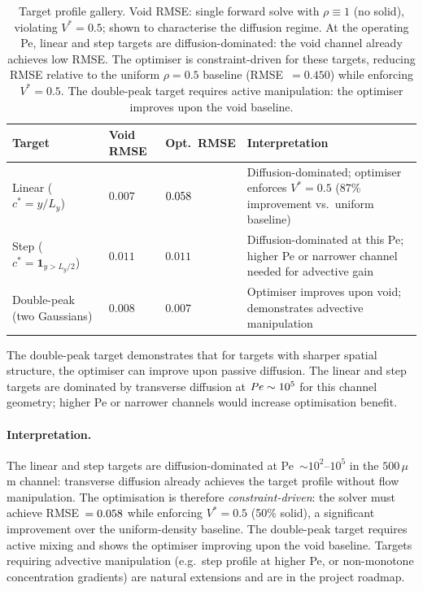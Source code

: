 \begin{table}[h]
\centering\small
\caption{Target profile gallery.
         Void RMSE: single forward solve with $\rho\equiv1$ (no solid),
         violating $V^*=0.5$; shown to characterise the diffusion regime.
         At the operating Pe, linear and step targets are diffusion-dominated:
         the void channel already achieves low RMSE.
         The optimiser is constraint-driven for these targets,
         reducing RMSE relative to the uniform $\rho=0.5$ baseline
         (RMSE~$=0.450$) while enforcing $V^*=0.5$.
         The double-peak target requires active manipulation:
         the optimiser improves upon the void baseline.}
\label{tab:gallery}
\begin{tabular}{@{}p{3.2cm}p{1.5cm}p{1.5cm}p{3.5cm}@{}}
\toprule
Target & Void RMSE & Opt.\ RMSE & Interpretation \\
\midrule
Linear ($c^*=y/L_y$) & $0.007$ & $0.058$ &
  Diffusion-dominated; optimiser enforces $V^*=0.5$
  (87\% improvement vs.\ uniform baseline) \\
Step ($c^*=\mathbf{1}_{y>L_y/2}$) & $0.011$ & $0.011$ &
  Diffusion-dominated at this Pe;
  higher Pe or narrower channel needed for advective gain \\
Double-peak (two Gaussians) & $0.008$ & $0.007$ &
  Optimiser improves upon void;
  demonstrates advective manipulation \\
\bottomrule
\end{tabular}
\end{table}

The double-peak target demonstrates that for targets with
sharper spatial structure, the optimiser can improve upon
passive diffusion.
The linear and step targets are dominated by transverse diffusion
at $\mathit{Pe}\sim10^5$ for this channel geometry;
higher Pe or narrower channels would increase optimisation benefit.

\paragraph{Interpretation.}
The linear and step targets are diffusion-dominated at
Pe~$\sim10^2$--$10^5$ in the $500\,\mu$m channel:
transverse diffusion already achieves the target profile
without flow manipulation.
The optimisation is therefore \emph{constraint-driven}:
the solver must achieve RMSE~$=0.058$
while enforcing $V^*=0.5$ (50\% solid),
a significant improvement over the uniform-density baseline.
The double-peak target requires active mixing
and shows the optimiser improving upon the void baseline.
Targets requiring advective manipulation (e.g.\ step profile
at higher Pe, or non-monotone concentration gradients)
are natural extensions and are in the project roadmap.

